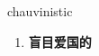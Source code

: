 
\begin{frame}
{\huge chauvinistic}
\begin{center}
\begin{enumerate}\Large
  \item \textbf{盲目爱国的}
\end{enumerate}
\end{center}
\end{frame}
